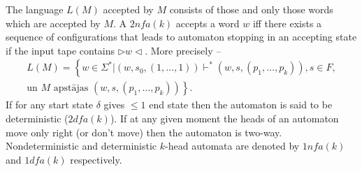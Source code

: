 \documentclass{llncs}
\begin{document}
The language $L(M)$ accepted by $M$ consists of those and only those words which are accepted by $M$. A $2nfa(k)$ accepts a word $w$ iff there exists a sequence of configurations that leads to automaton stopping in an accepting state if the input tape contains
$\triangleright w \triangleleft$. More precisely -- 
\begin{multline*}
	L(M)=\left\{ w \in \Sigma^* | \left(w,s_0,\left(1,\ldots,1\right)\right) \vdash^* \left(w,s,\left(p_1,\ldots,p_k\right)\right), s \in F,\right.\\
	\left.\textrm{un } M \textrm{ apstājas } \left(w,s,\left(p_1,\ldots,p_k\right)\right)\right\}.
\end{multline*}
If for any start state $\delta$ gives $\leq 1$ end state %
then the automaton is said to be deterministic ($2dfa(k)$). If at any given moment the heads of an automaton move only right (or don't move) then the automaton is two-way. Nondeterministic and deterministic $k$-head automata are denoted by $1nfa(k)$ and $1dfa(k)$ respectively.
\end{document}
